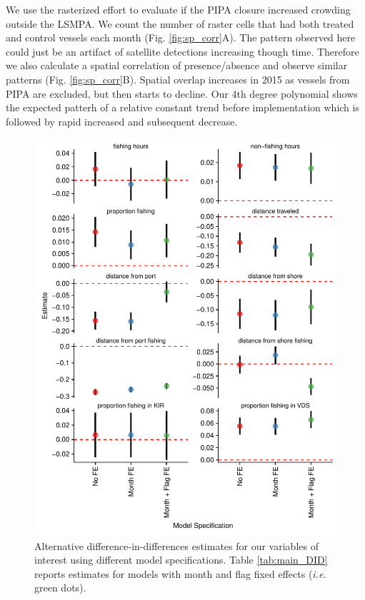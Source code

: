 \documentclass[9pttwoside,lineno]{pnas-new}
\begin{document}
We use the rasterized effort to evaluate if the PIPA closure increased
crowding outside the LSMPA. We count the number of raster cells that
had both treated and control vessels each month (Fig.
\ref{fig:sp_corr}A). The pattern observed here could just be an artifact
of satellite detections increasing though time. Therefore we also
calculate a spatial correlation of presence/absence and observe similar
patterns (Fig. \ref{fig:sp_corr}B). Spatial overlap increases
in 2015 as vessels from PIPA are excluded, but then starts to decline.
Our 4th degree polynomial shows the expected patterh of a relative
constant trend before implementation which is followed by rapid increased
and subsequent decrease.

\clearpage
\begin{landscape}




\end{landscape}
\clearpage

\begin{figure}
\centering
\includegraphics{img/other_specifications.pdf}
\caption{\label{fig:other_specifications}Alternative difference-in-differences estimates
for our variables of interest using different model specifications. Table \ref{tab:main_DID}
reports estimates for models with month and flag fixed effects (\emph{i.e.} green dots).}
\end{figure}
\end{document}

